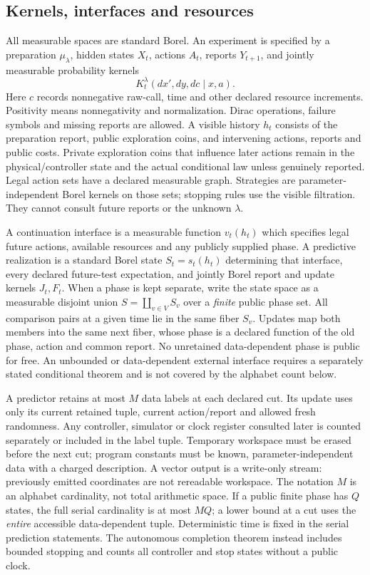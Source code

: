 \subsection{Kernels, interfaces and resources}
All measurable spaces are standard Borel. An experiment is specified by a preparation $\mu_\lambda$, hidden states $X_t$, actions $A_t$, reports $Y_{t+1}$, and jointly measurable probability kernels
\begin{equation}\label{eq:kernel}
 K_t^\lambda(dx',dy,dc\mid x,a).
\end{equation}
Here $c$ records nonnegative raw-call, time and other declared resource increments. Positivity means nonnegativity and normalization. Dirac operations, failure symbols and missing reports are allowed. A visible history $h_t$ consists of the preparation report, public exploration coins, and intervening actions, reports and public costs. Private exploration coins that influence later actions remain in the physical/controller state and the actual conditional law unless genuinely reported. Legal action sets have a declared measurable graph. Strategies are parameter-independent Borel kernels on those sets; stopping rules use the visible filtration. They cannot consult future reports or the unknown $\lambda$.

A continuation interface is a measurable function $v_t(h_t)$ which specifies legal future actions, available resources and any publicly supplied phase. A predictive realization is a standard Borel state $S_t=s_t(h_t)$ determining that interface, every declared future-test expectation, and jointly Borel report and update kernels $J_t,F_t$. When a phase is kept separate, write the state space as a measurable disjoint union $S=\coprod_{v\in V}S_v$ over a \emph{finite} public phase set. All comparison pairs at a given time lie in the same fiber $S_v$. Updates map both members into the same next fiber, whose phase is a declared function of the old phase, action and common report. No unretained data-dependent phase is public for free. An unbounded or data-dependent external interface requires a separately stated conditional theorem and is not covered by the alphabet count below.

A predictor retains at most $M$ data labels at each declared cut. Its update uses only its current retained tuple, current action/report and allowed fresh randomness. Any controller, simulator or clock register consulted later is counted separately or included in the label tuple. Temporary workspace must be erased before the next cut; program constants must be known, parameter-independent data with a charged description. A vector output is a write-only stream: previously emitted coordinates are not rereadable workspace. The notation $M$ is an alphabet cardinality, not total arithmetic space. If a public finite phase has $Q$ states, the full serial cardinality is at most $MQ$; a lower bound at a cut uses the \emph{entire} accessible data-dependent tuple. Deterministic time is fixed in the serial prediction statements. The autonomous completion theorem instead includes bounded stopping and counts all controller and stop states without a public clock.

